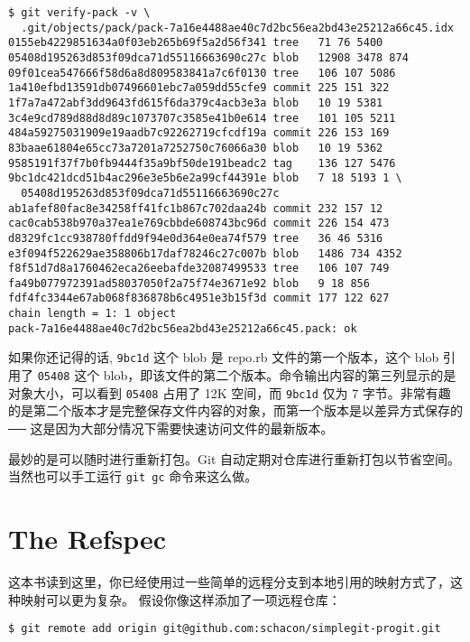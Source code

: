 \documentclass[a4paper]{book}
\begin{document}
\begin{shaded}\begin{verbatim}
$ git verify-pack -v \
  .git/objects/pack/pack-7a16e4488ae40c7d2bc56ea2bd43e25212a66c45.idx
0155eb4229851634a0f03eb265b69f5a2d56f341 tree   71 76 5400
05408d195263d853f09dca71d55116663690c27c blob   12908 3478 874
09f01cea547666f58d6a8d809583841a7c6f0130 tree   106 107 5086
1a410efbd13591db07496601ebc7a059dd55cfe9 commit 225 151 322
1f7a7a472abf3dd9643fd615f6da379c4acb3e3a blob   10 19 5381
3c4e9cd789d88d8d89c1073707c3585e41b0e614 tree   101 105 5211
484a59275031909e19aadb7c92262719cfcdf19a commit 226 153 169
83baae61804e65cc73a7201a7252750c76066a30 blob   10 19 5362
9585191f37f7b0fb9444f35a9bf50de191beadc2 tag    136 127 5476
9bc1dc421dcd51b4ac296e3e5b6e2a99cf44391e blob   7 18 5193 1 \
  05408d195263d853f09dca71d55116663690c27c
ab1afef80fac8e34258ff41fc1b867c702daa24b commit 232 157 12
cac0cab538b970a37ea1e769cbbde608743bc96d commit 226 154 473
d8329fc1cc938780ffdd9f94e0d364e0ea74f579 tree   36 46 5316
e3f094f522629ae358806b17daf78246c27c007b blob   1486 734 4352
f8f51d7d8a1760462eca26eebafde32087499533 tree   106 107 749
fa49b077972391ad58037050f2a75f74e3671e92 blob   9 18 856
fdf4fc3344e67ab068f836878b6c4951e3b15f3d commit 177 122 627
chain length = 1: 1 object
pack-7a16e4488ae40c7d2bc56ea2bd43e25212a66c45.pack: ok
\end{verbatim}\end{shaded}

如果你还记得的话, \texttt{9bc1d} 这个 blob 是 repo.rb 文件的第一个版本，这个 blob 引用了 \texttt{05408} 这个 blob，即该文件的第二个版本。命令输出内容的第三列显示的是对象大小，可以看到 \texttt{05408} 占用了 12K 空间，而 \texttt{9bc1d} 仅为 7 字节。非常有趣的是第二个版本才是完整保存文件内容的对象，而第一个版本是以差异方式保存的 ── 这是因为大部分情况下需要快速访问文件的最新版本。

最妙的是可以随时进行重新打包。Git 自动定期对仓库进行重新打包以节省空间。当然也可以手工运行 \texttt{git gc} 命令来这么做。

\section{The Refspec}

这本书读到这里，你已经使用过一些简单的远程分支到本地引用的映射方式了，这种映射可以更为复杂。 假设你像这样添加了一项远程仓库：

\begin{shaded}\begin{verbatim}
$ git remote add origin git@github.com:schacon/simplegit-progit.git
\end{verbatim}\end{shaded}
\end{document}
